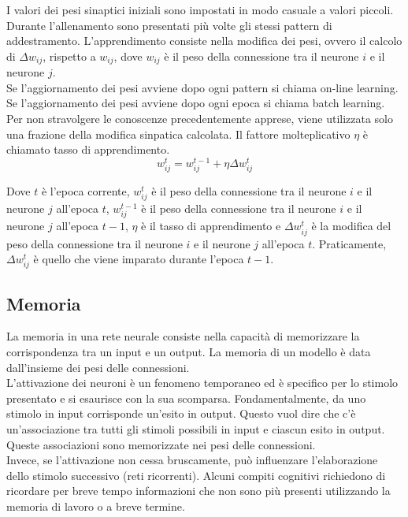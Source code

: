 I valori dei pesi sinaptici iniziali sono impostati in modo casuale a valori
piccoli. Durante l'allenamento sono presentati più volte gli stessi pattern di
addestramento. L'apprendimento consiste nella modifica dei pesi, ovvero il
calcolo di $\Delta w_{ij}$, rispetto a $w_{ij}$, dove $w_{ij}$ è il peso della
connessione tra il neurone $i$ e il neurone $j$.\\
Se l'aggiornamento dei pesi avviene dopo ogni pattern si chiama on-line
learning.  Se l'aggiornamento dei pesi avviene dopo ogni epoca si chiama batch
learning.\\
Per non stravolgere le conoscenze precedentemente apprese, viene utilizzata solo
una frazione della modifica sinpatica calcolata. Il fattore molteplicativo
$\eta$ è chiamato tasso di apprendimento.
\begin{equation*}
	w^t_{ij} = w^{t-1}_{ij} + \eta \Delta w^t_{ij}
\end{equation*}

Dove $t$ è l'epoca corrente, $w^t_{ij}$ è il peso della connessione tra il
neurone $i$ e il neurone $j$ all'epoca $t$, $w^{t-1}_{ij}$ è il peso della
connessione tra il neurone $i$ e il neurone $j$ all'epoca $t-1$, $\eta$ è il
tasso di apprendimento e $\Delta w^t_{ij}$ è la modifica del peso della
connessione tra il neurone $i$ e il neurone $j$ all'epoca $t$. Praticamente,
$\Delta w^t_{ij}$ è quello che viene imparato durante l'epoca $t-1$.

\subsection{Memoria}

La memoria in una rete neurale consiste nella capacità di memorizzare la
corrispondenza tra un input e un output. La memoria di un modello è data
dall'insieme dei pesi delle connessioni.\\
L'attivazione dei neuroni è un fenomeno temporaneo ed è specifico per lo stimolo
presentato e si esaurisce con la sua scomparsa. Fondamentalmente, da uno stimolo in
input corrisponde un'esito in output. Questo vuol dire che c'è
un'associazione tra tutti gli stimoli possibili in input e ciascun esito in
output. Queste associazioni sono memorizzate nei pesi delle connessioni.\\
Invece, se l'attivazione non cessa bruscamente, può influenzare l'elaborazione
dello stimolo successivo (reti ricorrenti). Alcuni compiti cognitivi richiedono
di ricordare per breve tempo informazioni che non sono più presenti utilizzando
la memoria di lavoro o a breve termine.

